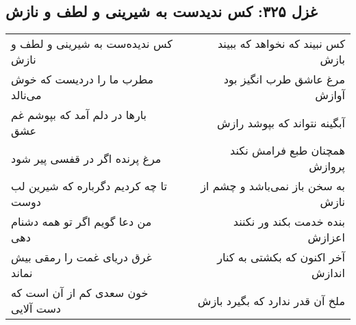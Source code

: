\begin{center}
\section*{غزل ۳۲۵: کس ندیدست به شیرینی و لطف و نازش}
\label{sec:325}
\begin{longtable}{l p{0.5cm} r}
کس ندیده‌ست به شیرینی و لطف و نازش
&&
کس نبیند که نخواهد که ببیند بازش
\\
مطرب ما را دردیست که خوش می‌نالد
&&
مرغ عاشق طرب انگیز بود آوازش
\\
بارها در دلم آمد که بپوشم غم عشق
&&
آبگینه نتواند که بپوشد رازش
\\
مرغ پرنده اگر در قفسی پیر شود
&&
همچنان طبع فرامش نکند پروازش
\\
تا چه کردیم دگرباره که شیرین لب دوست
&&
به سخن باز نمی‌باشد و چشم از نازش
\\
من دعا گویم اگر تو همه دشنام دهی
&&
بنده خدمت بکند ور نکنند اعزازش
\\
غرق دریای غمت را رمقی بیش نماند
&&
آخر اکنون که بکشتی به کنار اندازش
\\
خون سعدی کم از آن است که دست آلایی
&&
ملخ آن قدر ندارد که بگیرد بازش
\\
\end{longtable}
\end{center}
